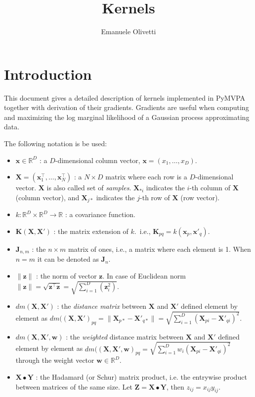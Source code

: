 \documentclass[a4paper,11pt]{article}
\title{Kernels}
\author{Emanuele Olivetti}
\newcommand\R{{\mathbb R}}
\newcommand\x{{\mathbf x}}
\newcommand\X{{\mathbf X}}
\newcommand\K{{\mathbf K}}
\newcommand\J{{\mathbf J}}
\begin{document}
\maketitle

\section{Introduction}
This document gives a detailed description of kernels implemented in
PyMVPA together with derivation of their gradients. Gradients are
useful when computing and maximizing the log marginal likelihood of a
Gaussian process approximating data.

The following notation is be used:
\begin{itemize}
\item $\x \in \R^D$ : a $D$-dimensional column vector, $\x =
  (x_1,\ldots,x_D)$.
\item $\X = (\x_1^{\top},\ldots,\x_N^{\top})$ : a $N \times D$
  matrix where each row is a $D$-dimensional vector. $\X$ is also
  called set of \emph{samples}. $\X_{* i}$ indicates the $i$-th
  column of $\X$ (column vector), and $\X_{j *}$ indicates the
  $j$-th row of $\X$ (row vector).
\item $k: \R^D \times \R^D \rightarrow \R$ : a covariance function.
\item $\K(\X,\X')$ : the matrix extension of $k$.\, i.e., $\K_{pq} =
  k(\x_p,\x'_q)$.
\item $\J_{n,m}$ : the $n \times m$ matrix of ones, i.e., a matrix
  where each element is 1. When $n = m$ it can be denoted as $\J_n$.
\item $\|\mathbf{z}\|$ : the norm of vector $\mathbf{z}$. In case of
  Euclidean norm $\|\mathbf{z}\| = \sqrt{\mathbf{z}^{\top}\mathbf{z}}
  = \sqrt{\sum_{i=1}^D (\mathbf{z}_i^2)}$.
\item $dm(\X,\X')$ : the \emph{distance matrix} between $\X$ and $\X'$
  defined element by element as $dm((\X,\X')_{pq} = \|\X_{p *} -
  \X'_{q *}\| = \sqrt{\sum_{i=1}^D (\X_{p i} - \X'_{q i})^2}$.
\item $dm(\X,\X',\mathbf{w})$ : the \emph{weighted} distance matrix
  between $\X$ and $\X'$ defined element by element as
  $dm((\X,\X',\mathbf{w})_{pq} = \sqrt{\sum_{i=1}^D w_i(\X_{p i} -
    \X'_{q i})^2}$ through the weight vector $\mathbf{w} \in \R^D$.
\item $\X \bullet \mathbf{Y}$ : the Hadamard (or Schur) matrix
  product, i.e. the entrywise product between matrices of the same
  size. Let $\mathbf{Z} = \X \bullet \mathbf{Y}$, then $z_{ij} =
  x_{ij} y_{ij}$.
\end{itemize}
\end{document}
